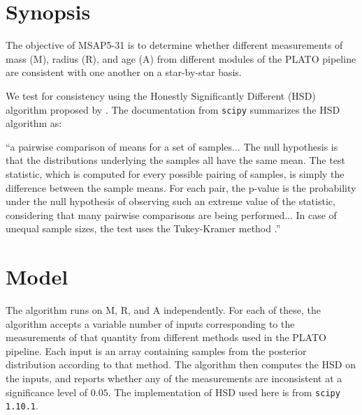 \documentclass[a4paper, oneside, 11pt, article, english]{memoir}
\begin{document}



\section{Synopsis}
\label{sec:synopsis}

The objective of MSAP5-31 is to determine whether different measurements of mass (M), radius (R), and age (A) from different modules of the PLATO pipeline are consistent with one another on a star-by-star basis. 

We test for consistency using the Honestly Significantly Different (HSD) algorithm proposed by \citet{Tukey}. 
The documentation from \texttt{scipy} \citep{SciPy} summarizes the HSD algorithm as: 

``a pairwise comparison of means for a set of samples... The null hypothesis is that the distributions underlying the samples all have the same mean. The test statistic, which is computed for every possible pairing of samples, is simply the difference between the sample means. For each pair, the p-value is the probability under the null hypothesis of observing such an extreme value of the statistic, considering that many pairwise comparisons are being performed... In case of unequal sample sizes, the test uses the Tukey-Kramer method \citep{Kramer}.''





\section{Model}
\label{sec:model}

The algorithm runs on M, R, and A independently. 
For each of these, the algorithm accepts a variable number of inputs corresponding to the measurements of that quantity from different methods used in the PLATO pipeline. 
Each input is an array containing samples from the posterior distribution according to that method. 
The algorithm then computes the HSD on the inputs, and reports whether any of the measurements are inconsistent at a significance level of $0.05$. 
The implementation of HSD used here is from \texttt{scipy 1.10.1}. 
\end{document}

